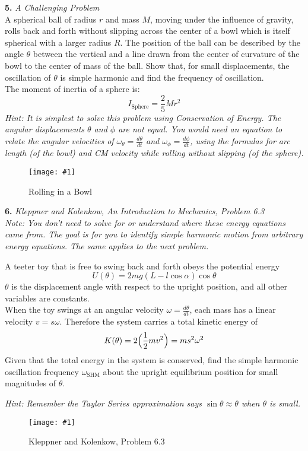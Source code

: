 \documentclass[11pt]{article}
\newcommand{\fig}[4]{
    \begin{figure}[H]
        \centering
        \texttt{[image: \#1]}
        \caption{#2}
        \label{exp4fit}
    \end{figure}
}
\theoremstyle{gangnamstyle}{\newtheorem{definition}{Definition}[]}
\theoremstyle{gangnamstyle}{\newtheorem{example}{Example}[]}
\theoremstyle{gangnamstyle}{\newtheorem{problem}{Problem}[]}
\begin{document}
\textbf{5.} \textit{A Challenging Problem} \\
A spherical ball of radius $r$ and mass $M$, moving under the influence of gravity, rolls back and forth without slipping across the center of a bowl which is itself spherical with a larger radius $R$. The position of the ball can be described by the angle $\theta$ between the vertical and a line drawn from the center of curvature of the bowl to the center of mass of the ball. Show that, for small displacements, the oscillation of $\theta$ is simple harmonic and find the frequency of oscillation. \\
The moment of inertia of a sphere is: 
\[ I_{\text{Sphere}} = \frac{2}{5}Mr^2 \]
\textit{Hint: It is simplest to solve this problem using Conservation of Energy. The angular displacements $\theta$ and $\phi$ are not equal. You would need an equation to relate the angular velocities of $\omega_\theta = \frac{d\theta}{dt}$ and $\omega_\phi = \frac{d\phi}{dt}$, using the formulas for arc length (of the bowl) and CM velocity while rolling without slipping (of the sphere).}
\fig{figs/0729/charman.png}{Rolling in a Bowl}{0.75}{0}

\pagebreak

\textbf{6.} \textit{Kleppner and Kolenkow, An Introduction to Mechanics, Problem 6.3} \\
\textit{Note: You don't need to solve for or understand where these energy equations came from. The goal is for you to identify simple harmonic motion from arbitrary energy equations. The same applies to the next problem. }

A teeter toy that is free to swing back and forth obeys the potential energy
\[ U(\theta) = 2mg(L - l\cos\alpha)\cos\theta \]
$\theta$ is the displacement angle with respect to the upright position, and all other variables are constants. \\
When the toy swings at an angular velocity $\omega = \frac{d\theta}{dt}$, each mass has a linear velocity $v = s\omega$. Therefore the system carries a total kinetic energy of 
\[ K(\theta) = 2\Bigl(\frac{1}{2}mv^2\Bigr) = ms^2\omega^2 \]
Given that the total energy in the system is conserved, find the simple harmonic oscillation frequency $\omega_{\text{SHM}}$ about the upright equilibrium position for small magnitudes of $\theta$. 

\textit{Hint: Remember the Taylor Series approximation says $\sin\theta \approx \theta$ when $\theta$ is small.}

\fig{figs/0729/kk63.png}{Kleppner and Kolenkow, Problem 6.3}{0.5}{0}
\end{document}
